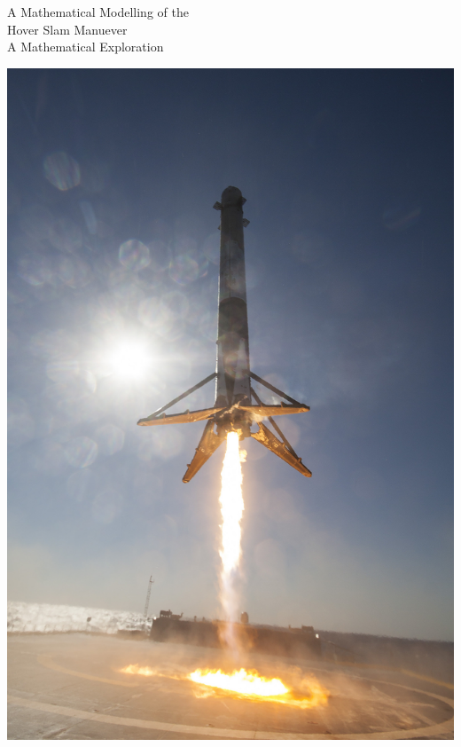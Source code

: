 \documentclass[12pt]{article}
\begin{document}
    \begin{titlepage}
        \begin{center}
            {\LARGE A Mathematical Modelling of the \\ Hover Slam Manuever}
            \break
            \\
            {\large A Mathematical Exploration}
            \break
            

            \vspace{14mm}
            \includegraphics[scale=0.17]{hoverslam2.jpg}
            

        \end{center}
    \end{titlepage}
\end{document}
